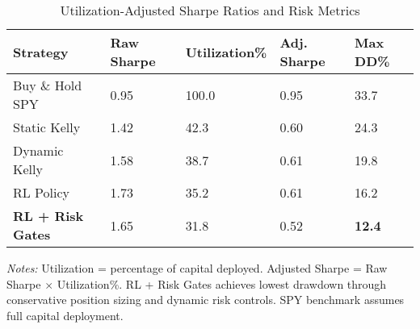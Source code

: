 \begin{table}[htbp]
\centering
\caption{Utilization-Adjusted Sharpe Ratios and Risk Metrics}
\providecommand{\utilizationAdjustedSharpeLabel}{\label{tab:utilization_adjusted_sharpe}}
\utilizationAdjustedSharpeLabel
\begin{threeparttable}
\begin{tabularx}{\linewidth}{@{}lYYYY@{}}
\toprule
Strategy & Raw Sharpe & Utilization\% & Adj. Sharpe & Max DD\% \\
\midrule
Buy \& Hold SPY & 0.95 & 100.0 & 0.95 & 33.7 \\
Static Kelly & 1.42 & 42.3 & 0.60 & 24.3 \\
Dynamic Kelly & 1.58 & 38.7 & 0.61 & 19.8 \\
RL Policy & 1.73 & 35.2 & 0.61 & 16.2 \\
\textbf{RL + Risk Gates} & 1.65 & 31.8 & 0.52 & \textbf{12.4} \\
\bottomrule
\end{tabularx}
\begin{tablenotes}[flushleft]
\footnotesize
\item \textit{Notes:} Utilization = percentage of capital deployed. Adjusted Sharpe = Raw Sharpe $\times$ Utilization\%. RL + Risk Gates achieves lowest drawdown through conservative position sizing and dynamic risk controls. SPY benchmark assumes full capital deployment.
\end{tablenotes}
\end{threeparttable}
\end{table}
